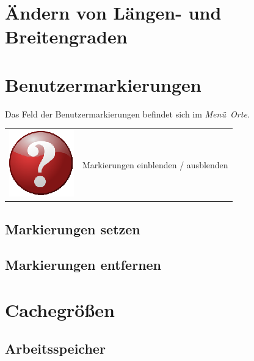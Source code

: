 \documentclass[10pt]{scrreprt}
\newcommand{\textref}[1]{\mbox{\raisebox{0.1ex}{\small$\rightarrow$ }\textit{#1}}}
\begin{document}
\vspace{3mm}
\section{Ändern von Längen- und Breitengraden}




\vspace{3mm}
\section{Benutzermarkierungen}
Das Feld der Benutzermarkierungen befindet sich im \textref{Menü Orte}.


\vspace{3mm}
\begin{tabular}{>{\centering \arraybackslash}m{1cm} m{14cm}}
\includegraphics[scale=0.5]{images/quest.eps} & Markierungen einblenden / ausblenden
\end{tabular}


\vspace{3mm}
\subsection{Markierungen setzen}


\vspace{3mm}
\subsection{Markierungen entfernen}




\vspace{3mm}
\section{Cachegrößen} 

\vspace{3mm}
\subsection{Arbeitsspeicher}

\vspace{3mm}
\end{document}
